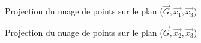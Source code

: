 \documentclass[a4paper]{article}
\begin{document}
\begin{enumerate}
\begin{figure}[H]
\hfill
{}
\caption{Projection du nuage de points sur le plan ($\vec{G},\vec{x_{1}},\vec{x_{3}}$) }\label{fig:somefiglabel}
\end{figure}



\begin{figure}[H]
\hfill
{}
\caption{Projection du nuage de points sur le plan ($\vec{G},\vec{x_{2}},\vec{x_{3}}$) }\label{fig:somefiglabel}
\end{figure}

\end{enumerate}
\end{document}
